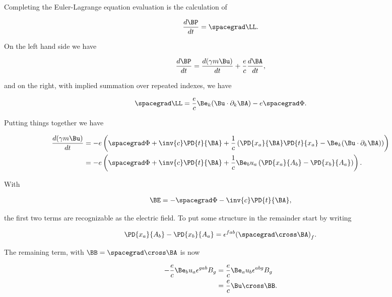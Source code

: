 Completing the Euler-Lagrange equation evaluation is the calculation of

\begin{align}\label{eqn:hamiltonian:em2b}
\frac{d\BP}{dt} = \spacegrad \LL.
\end{align}

On the left hand side we have

\begin{align}\label{eqn:hamiltonian:em2l}
\frac{d\BP}{dt} = \frac{d(\gamma m \Bu)}{dt} + \frac{e}{c} \frac{d\BA }{dt},
\end{align}

and on the right, with implied summation over repeated indexes, we have

\begin{align}\label{eqn:hamiltonian:em2r}
\spacegrad \LL = \frac{e}{c} \Be_k (\Bu \cdot \partial_k \BA) - e \spacegrad \Phi.
\end{align}

Putting things together we have

\begin{align*}
\frac{d(\gamma m \Bu)}{dt} 
&= 
-e \left(
\spacegrad \Phi + \inv{c} \PD{t}{\BA}
+ \frac{1}{c} 
\left(
\PD{x_a}{\BA} \PD{t}{x_a} - \Be_k (\Bu \cdot \partial_k \BA) 
\right)
\right) \\
&= 
-e \left(
\spacegrad \Phi + \inv{c} \PD{t}{\BA}
+ \frac{1}{c} \Be_b u_a
\left(
\PD{x_a}{A_b} 
-
\PD{x_b}{A_a}
\right)
\right).
\end{align*}

With 

\begin{align}\label{eqn:hamiltonian:em3}
\BE = -\spacegrad \Phi - \inv{c} \PD{t}{\BA},
\end{align}

the first two terms are recognizable as the electric field.  To put some structure in the remainder start by writing

\begin{align}\label{eqn:hamiltonian:em4}
\PD{x_a}{A_b} - \PD{x_b}{A_a} = \epsilon^{fab} {(\spacegrad \cross \BA)}_f.
\end{align}

The remaining term, with $\BB = \spacegrad \cross \BA$ is now 
 
\begin{align*}
- \frac{e}{c} \Be_b u_a \epsilon^{gab} B_g
&=
\frac{e}{c} 
\Be_a u_b \epsilon^{abg} B_g \\
&= 
\frac{e}{c} \Bu \cross \BB.
\end{align*}

